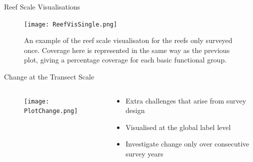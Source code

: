 \documentclass{beamer}
\begin{document}
             \begin{frame}{Reef Scale Visualisations}
                \begin{figure}
                    \centering
                    \texttt{[image: ReefVisSingle.png]}
                    \caption{An example of the reef scale visualisaton for the reefs only surveyed once. Coverage here is represented in the same way as the previous plot, giving a percentage coverage for each basic functional group.}
                \end{figure}
             \end{frame}


             \begin{frame}{Change at the Transect Scale}
               \begin{columns}[T]
                 \begin{column}{0.48\textwidth}
                   \centering
                    \begin{figure}
                        \centering
                        \texttt{[image: PlotChange.png]}
                   \end{figure}
                 \end{column}
                 \begin{column}{0.48\textwidth}
                   \centering
                    \begin{itemize}
                      \item Extra challenges that arise from survey design
                      \item Visualised at the global label level
                      \item Investigate change only over consecutive survey years
                    \end{itemize}
                 \end{column}
              \end{columns}
             \end{frame}
\end{document}
